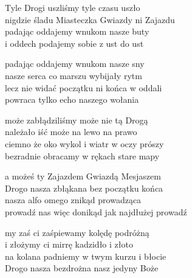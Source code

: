 \begin{text}
    Tyle Drogi uszliśmy tyle czasu uszło\\
    nigdzie śladu Miasteczka Gwiazdy ni Zajazdu\\
    padając oddajemy wnukom nasze buty\\
    i oddech podajemy sobie z ust do ust

    padając oddajemy wnukom nasze sny\\
    nasze serca co marszu wybijały rytm\\
    lecz nie widać początku ni końca w oddali\\
    powraca tylko echo naszego wołania

    może zabłądziliśmy może nie tą Drogą\\
    należało iść może na lewo na prawo\\
    ciemno że oko wykol i wiatr w oczy prószy\\
    bezradnie obracamy w rękach stare mapy

    a możeś ty Zajazdem Gwiazdą Mesjaszem\\
    Drogo nasza zbłąkana bez początku końca\\
    nasza alfo omego znikąd prowadząca\\
    prowadź nas więc donikąd jak najdłużej prowadź

    my zaś ci zaśpiewamy kolędę podróżną\\
    i złożymy ci mirrę kadzidło i złoto\\
    na kolana padniemy w twym kurzu i błocie\\
    Drogo nasza bezdrożna nasz jedyny Boże
\end{text}
\begin{chord}

\end{chord}